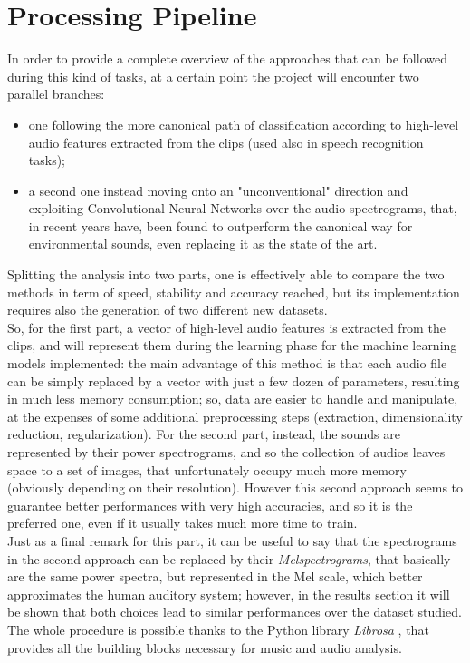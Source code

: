
\section{Processing Pipeline}
\label{sec:processing_architecture}

In order to provide a complete overview of the approaches that can be followed during this kind of tasks, at a certain point the project will encounter two parallel branches:
\begin{itemize}
	\itemsep0em
	\item one following the more canonical path of classification according to high-level audio features extracted from the clips (used also in speech recognition tasks);
	\item a second one instead moving onto an "unconventional" direction and exploiting Convolutional Neural Networks over the audio spectrograms, that, in recent years have, been found to outperform the canonical way for environmental sounds, even replacing it as the state of the art.
\end{itemize} 
Splitting the analysis into two parts, one is effectively able to compare the two methods in term of speed, stability and accuracy reached, but its implementation requires also the generation of two different new datasets.\\
So, for the first part, a vector of high-level audio features is extracted from the clips, and will represent them during the learning phase for the machine learning models implemented: the main advantage of this method is that each audio file can be simply replaced by a vector with just a few dozen of parameters, resulting in much less memory consumption; so, data are easier to handle and manipulate, at the expenses of some additional preprocessing steps (extraction, dimensionality reduction, regularization). For the second part, instead, the sounds are represented by their power spectrograms, and so the collection of audios leaves space to a set of images, that unfortunately occupy much more memory (obviously depending on their resolution). However this second approach seems to guarantee better performances with very high accuracies, and so it is the preferred one, even if it usually takes much more time to train.\\
Just as a final remark for this part, it can be useful to say that the spectrograms in the second approach can be replaced by their \textit{Melspectrograms}, that basically are the same power spectra, but represented in the Mel scale, which better approximates the human auditory system; however, in the results section it will be shown that both choices lead to similar performances over the dataset studied.\\
The whole procedure is possible thanks to the Python library \textit{Librosa} \cite{mcfee2015librosa}, that provides all the building blocks necessary for music and audio analysis. 


